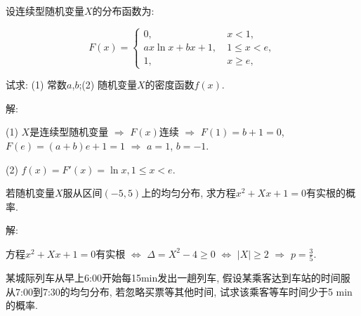 \documentclass[standard]{ExBook}
\begin{document}
\begin{qitems}
\vspace{-5em}

    \begin{bbox}
    \begin{shaded}
        \qitem
设连续型随机变量$X$的分布函数为:
\vspace{-2em}
\begin{center}
\begin{equation}
    F(x)=
    \left\{
    \begin{array}{cl}
        \nonumber
        0,\ &x < 1,\\
        ax\ln x+bx+1,\ &1 \leq x < e,\\
        1,\ &x \geq e,
    \end{array}
    \right.
\end{equation}
\end{center}
试求: (1) 常数$a$,$b$;\qquad(2) 随机变量$X$的密度函数$f(x)$.
    \end{shaded}
    \end{bbox}

\vspace{-5em}

    \begin{bbox}
解: 

(1) $X$是连续型随机变量 $\Longrightarrow$ $F(x)$连续 $\Longrightarrow$ $F(1)=b+1=0$, $F(e)=(a+b)e+1=1$ $\Longrightarrow$ $a=1$, $b=-1$.

(2) $f(x)=F'(x)=\ln x,1 \leq x < e$.
    \end{bbox}

\vspace{-5em}

    \begin{bbox}
    \begin{shaded}
        \qitem
若随机变量$X$服从区间$(-5,5)$上的均匀分布, 求方程$x^2+Xx+1=0$有实根的概率.
    \end{shaded}
    \end{bbox}

\vspace{-5em}

    \begin{bbox}
解: 

方程$x^2+Xx+1=0$有实根 $\Longleftrightarrow$ $\Delta=X^2-4\geq0$ $\Longleftrightarrow$ $|X|\geq 2$ $\Longrightarrow$ $p=\displaystyle\frac{3}{5}$.
    \end{bbox}

\vspace{-5em}

    \begin{bbox}
    \begin{shaded}
        \qitem
某城际列车从早上6:00开始每15min发出一趟列车, 假设某乘客达到车站的时间服从7:00到7:30的均匀分布, 若忽略买票等其他时间, 试求该乘客等车时间少于5 min的概率.
    \end{shaded}
    \end{bbox}


\end{qitems}
\end{document}
